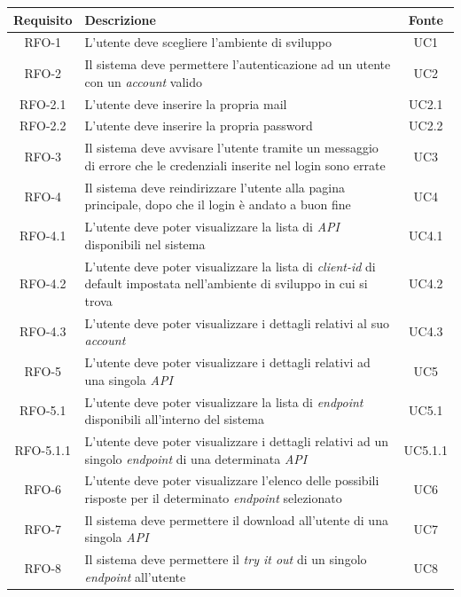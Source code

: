 \begin{center}
\label{tab:requisiti-funzionali}
\begin{longtable}{|c|p{}|c|}
\hline
\textbf{Requisito} & \textbf{Descrizione} & \textbf{Fonte}\\
\hline
RFO-1 &L'utente deve scegliere l'ambiente di sviluppo & UC1 \\
\hline
RFO-2 &Il sistema deve permettere l'autenticazione ad un utente con un \textit{account} valido & UC2 \\
\hline
RFO-2.1 & L'utente deve inserire la propria mail & UC2.1 \\
\hline
RFO-2.2 & L'utente deve inserire la propria password & UC2.2 \\
\hline
RFO-3 &Il sistema deve avvisare l'utente tramite un messaggio di errore che le credenziali inserite nel login sono errate & UC3 \\
\hline
RFO-4 &Il sistema deve reindirizzare l'utente alla pagina principale, dopo che il login è andato a buon fine & UC4 \\
\hline
RFO-4.1 &L'utente deve poter visualizzare la lista di \textit{API} disponibili nel sistema & UC4.1 \\
\hline
RFO-4.2 &L'utente deve poter visualizzare la lista di \textit{client-id} di default impostata nell'ambiente di sviluppo in cui si trova & UC4.2 \\
\hline
RFO-4.3 &L'utente deve poter visualizzare i dettagli relativi al suo \textit{account} & UC4.3 \\
\hline
RFO-5 &L'utente deve poter visualizzare i dettagli relativi ad una singola \textit{API}  & UC5 \\
\hline
RFO-5.1 &L'utente deve poter visualizzare la lista di \textit{endpoint} disponibili all'interno del sistema & UC5.1 \\
\hline
RFO-5.1.1 &L'utente deve poter visualizzare i dettagli relativi ad un singolo \textit{endpoint} di una determinata \textit{API} & UC5.1.1 \\
\hline
RFO-6 &L'utente deve poter visualizzare l'elenco delle possibili risposte per il determinato \textit{endpoint} selezionato & UC6 \\
\hline
RFO-7 &Il sistema deve permettere il download all'utente di una singola \textit{API} & UC7 \\
\hline
RFO-8 &Il sistema deve permettere il \textit{try it out} di un singolo \textit{endpoint} all'utente & UC8 \\

\end{longtable}
\end{center}
